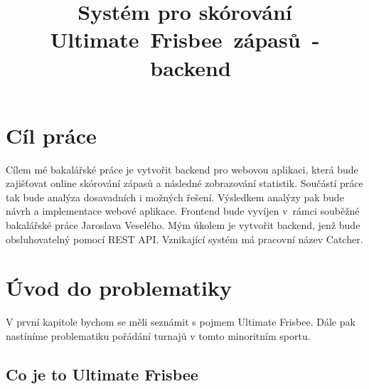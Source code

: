 \documentclass[thesis=B,czech]{FITthesis}[2012/06/26]
\title{Systém pro skórování Ultimate~Frisbee~zápasů~-~backend}
\begin{document}


\begin{introduction}
\end{introduction}

\chapter{Cíl práce}

Cílem mé bakalářské práce je vytvořit backend pro webovou aplikaci, která bude zajišťovat online
skórování zápasů a následné zobrazování statistik. Sou\-částí práce tak bude analýza dosavadních
i možných řešení. Výsledkem analýzy pak bude návrh a implementace webové aplikace. Frontend bude
vyvíjen v~rámci souběžné bakalářské práce Jaroslava Veselého. Mým úkolem je vytvořit backend,
jenž bude obsluhovatelný pomocí REST API. Vznikající systém má pracovní název Catcher.

%
%

\chapter{Úvod do problematiky}

\indent

V první kapitole bychom se měli seznámit s pojmem Ultimate Frisbee. Dále pak nastíníme
problematiku pořádání turnajů v tomto minoritním sportu.

\section{Co je to Ultimate Frisbee}

\end{document}
